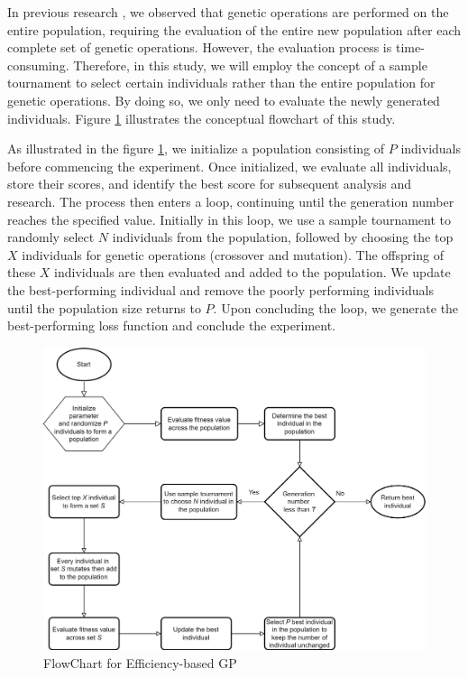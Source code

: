 \begin{ZhChapter}
In previous research \cite{akhmedova2024generationlossfunctionimage}, we observed that genetic operations are performed on the entire population, requiring the evaluation of the entire new population after each complete set of genetic operations. However, the evaluation process is time-consuming. Therefore, in this study, we will employ the concept of a sample tournament to select certain individuals rather than the entire population for genetic operations. By doing so, we only need to evaluate the newly generated individuals. Figure \ref{fig: FlowChart} illustrates the conceptual flowchart of this study.

As illustrated in the figure \ref{fig: FlowChart}, we initialize a population consisting of $P$ individuals before commencing the experiment. Once initialized, we evaluate all individuals, store their scores, and identify the best score for subsequent analysis and research. The process then enters a loop, continuing until the generation number reaches the specified value. Initially in this loop, we use a sample tournament to randomly select $N$ individuals from the population, followed by choosing the top $X$ individuals for genetic operations (crossover and mutation). The offspring of these $X$ individuals are then evaluated and added to the population. We update the best-performing individual and remove the poorly performing individuals until the population size returns to $P$. Upon concluding the loop, we generate the best-performing loss function and conclude the experiment.

\begin{figure}[htbp]
    \centering
    \includegraphics[width = 1\textwidth]{image/FlowChart.png}
    \caption{FlowChart for Efficiency-based GP}
    \label{fig: FlowChart}
\end{figure}


\end{ZhChapter}
